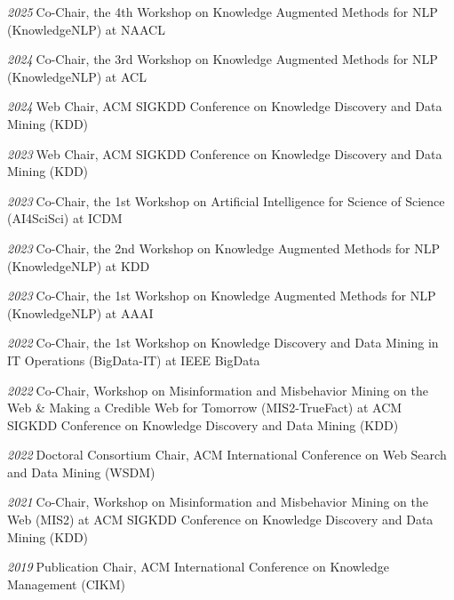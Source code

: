 \documentclass[10pt]{article}
\newenvironment{myindentpar}[1]%
{\begin{list}{}%
         {\setlength{\leftmargin}{#1}}%
         \item[]%
}
{\end{list}}
\newcounter{list}
\begin{document}
\begin{myindentpar}{0.75cm}
{\hspace{-0.75cm}\textit{2025}\textcolor{white}{.}Co-Chair, the 4th Workshop on Knowledge Augmented Methods for NLP (KnowledgeNLP) at NAACL

\hspace{-0.75cm}\textit{2024}\textcolor{white}{.}Co-Chair, the 3rd Workshop on Knowledge Augmented Methods for NLP (KnowledgeNLP) at ACL

\hspace{-0.75cm}\textit{2024}\textcolor{white}{.}Web Chair, ACM SIGKDD Conference on Knowledge Discovery and Data Mining (KDD)

\hspace{-0.75cm}\textit{2023}\textcolor{white}{.}Web Chair, ACM SIGKDD Conference on Knowledge Discovery and Data Mining (KDD)

\hspace{-0.75cm}\textit{2023}\textcolor{white}{.}Co-Chair, the 1st Workshop on Artificial Intelligence for Science of Science (AI4SciSci) at ICDM

\hspace{-0.75cm}\textit{2023}\textcolor{white}{.}Co-Chair, the 2nd Workshop on Knowledge Augmented Methods for NLP (KnowledgeNLP) at KDD

\hspace{-0.75cm}\textit{2023}\textcolor{white}{.}Co-Chair, the 1st Workshop on Knowledge Augmented Methods for NLP (KnowledgeNLP) at AAAI

\hspace{-0.75cm}\textit{2022}\textcolor{white}{.}Co-Chair, the 1st Workshop on Knowledge Discovery and Data Mining in IT Operations (BigData-IT) at IEEE BigData

\hspace{-0.75cm}\textit{2022}\textcolor{white}{.}Co-Chair, Workshop on Misinformation and Misbehavior Mining on the Web \& Making a Credible Web for Tomorrow (MIS2-TrueFact) at ACM SIGKDD Conference on Knowledge Discovery and Data Mining (KDD)

\hspace{-0.75cm}\textit{2022}\textcolor{white}{.}Doctoral Consortium Chair, ACM International Conference on Web Search and Data Mining (WSDM)

\hspace{-0.75cm}\textit{2021}\textcolor{white}{.}Co-Chair, Workshop on Misinformation and Misbehavior Mining on the Web (MIS2) at ACM SIGKDD Conference on Knowledge Discovery and Data Mining (KDD)

\hspace{-0.75cm}\textit{2019}\textcolor{white}{.}Publication Chair, ACM International Conference on Knowledge Management (CIKM)

}
\end{myindentpar}
\end{document}

